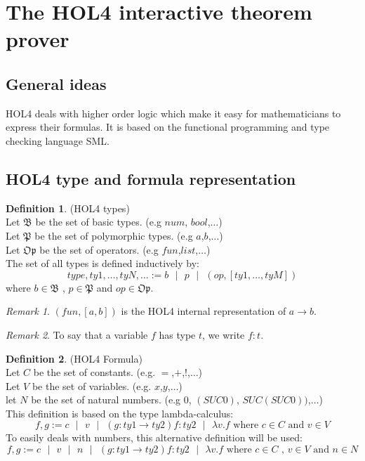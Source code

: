 \documentclass[a4paper, 11pt]{article}
\theoremstyle{plain}
\theoremstyle{definition}
\newtheorem*{mydef}{Definition}
\theoremstyle{remark}
\newtheorem*{remark}{Remark}
\newcommand\sep{\mbox{ } | \mbox{ }}
\begin{document}
\section{The HOL4 interactive theorem prover}
\subsection{General ideas}
  HOL4 deals with higher order logic which make it easy for mathematicians to express their formulas. 
  It is based on the functional programming and type checking
  language SML. 
 
  
\subsection{HOL4 type and formula representation}
   
\begin{mydef} (HOL4 types)
\\Let $\mathfrak{B}$ be the set of basic types. (e.g $num$, $bool$,$\ldots$)
\\Let $\mathfrak{P}$ be the set of polymorphic types. (e.g $a$,$b$,$\ldots$)
\\Let $\mathfrak{Op}$ be the set of operators. (e.g $fun$,$list$,$\ldots$)
\\The set of all types is defined inductively by:
 \[type,ty1,\ldots,tyN,\ldots := b \sep p \sep (op,[ty1,\ldots,tyM])\] 
where $b \in \mathfrak{B}$ ,  $p \in \mathfrak{P}$ and $op \in \mathfrak{Op}$.
\end{mydef}
 
\begin{remark} 
$(fun,[a,b])$ is the HOL4 internal representation of $a \rightarrow b$.
\end{remark}

\begin{remark} 
To say that a variable $f$ has type $t$, we write $f:t$.
\end{remark}

\begin{mydef} (HOL4 Formula)
\\Let $C$ be the set of constants. (e.g. $=$,$+$,$!$,$\ldots$)
\\Let $V$ be the set of variables. (e.g. $x$,$y$,$\ldots$)
\\let $N$ be the set of natural numbers. (e.g $0$, $(SUC 0)$, $SUC (SUC 0))$,$\ldots$)
\\This definition is based on the type lambda-calculus:
\[ f,g:= c \sep v \sep (g:ty1 \rightarrow ty2) f:ty2 \sep \lambda v. f 
  \mbox{ where } c \in C \mbox{ and } v \in V \] 
To easily deals with numbers, this alternative definition will be used:
\[ f,g := c \sep v \sep n \sep (g:ty1 \rightarrow ty2) f:ty2 \sep \lambda v. f
  \mbox{ where } c \in C \mbox{ , } v \in V \mbox{ and } n \in N\]
\end{mydef}
\end{document}
